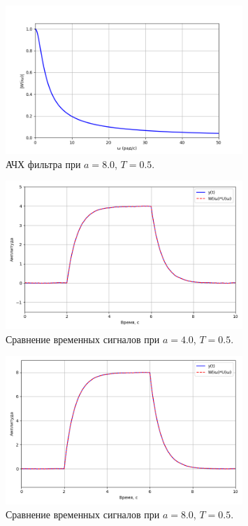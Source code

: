 \documentclass[a4paper]{article}
\begin{document}
\begin{figure}[H]
  \centering
  \includegraphics[width=0.8\textwidth]{src/task_1_1/ach_8.0_0.5.png}
  \caption{АЧХ фильтра при $a = 8.0$, $T = 0.5$.}
\end{figure}

\begin{figure}[H]
  \centering
  \includegraphics[width=0.8\textwidth]{src/task_1_1/time_comp_4.0_0.5.png}
  \caption{Сравнение временных сигналов при $a = 4.0$, $T = 0.5$.}
\end{figure}

\begin{figure}[H]
  \centering
  \includegraphics[width=0.8\textwidth]{src/task_1_1/time_comp_8.0_0.5.png}
  \caption{Сравнение временных сигналов при \(a=8.0\), \(T=0.5\).}
\end{figure}
\end{document}
